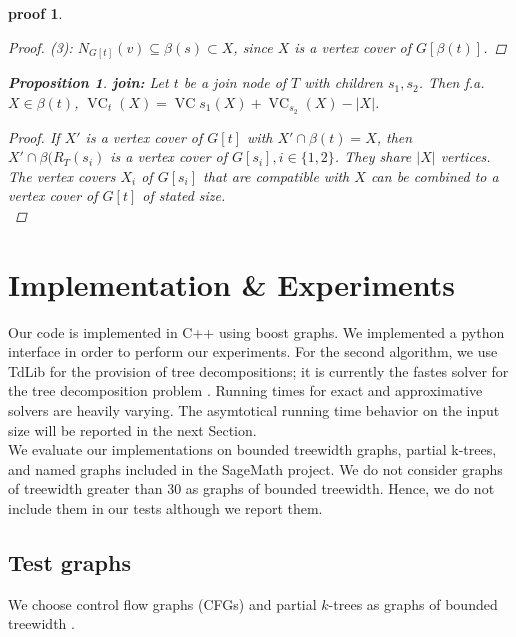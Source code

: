 \documentclass[11pt,a4paper]{article}
\newtheorem*{proposition}{Proposition}
\newtheorem*{proof_}{proof}
\DeclareMathOperator{\VC}{VC}
\begin{document}
\begin{proof_}
\begin{proof}
(3): $N_{G[t]}(v) \subseteq \beta(s) \subset X$, since $X$ is a vertex cover of $G[\beta(t)]$.
\end{proof}


\begin{proposition}
\textbf{join:} Let $t$ be a join node of $T$ with children $s_{1}, s_{2}$. Then f.a. $X \in \beta(t)$, $\VC_{t}(X) = \VC{s_{1}}(X) + \VC_{s_{2}}(X) - |X|$.
\end{proposition}

\begin{proof}
If $X'$ is a vertex cover of $G[t]$ with $X' \cap \beta(t) = X$, then $X' \cap \beta(R_{T}(s_{i})$ is a vertex cover of $G[s_{i}], i \in \{1,2\}$. They share $|X|$ vertices. The vertex covers $X_{i}$ of $G[s_{i}]$ that are compatible with $X$ can be combined to a vertex cover of $G[t]$ of stated size.  \\
\end{proof}
\end{proof_}

\section{Implementation \& Experiments}

Our code is implemented in C++ using boost graphs. We implemented a python interface in order to perform our experiments. For the second algorithm, we use TdLib for the provision of tree decompositions; it is currently the fastes solver for the tree decomposition problem \cite{TdLib} \cite{PACE_2017}. Running times for exact and approximative solvers are heavily varying. The asymtotical running time behavior on the input size will be reported in the next Section. \\

We evaluate our implementations on bounded treewidth graphs, partial k-trees, and named graphs included in the SageMath project. We do not consider graphs of treewidth greater than 30 as graphs of bounded treewidth. Hence, we do not include them in our tests although we report them.

\subsection{Test graphs}

We choose control flow graphs (CFGs) and partial $k$-trees as graphs of bounded treewidth \cite{Ctree}. \\
\end{document}
